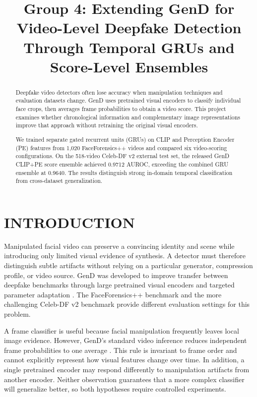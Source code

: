 \documentclass[conference,10pt]{IEEEtran}
\begin{document}
\title{Group 4: Extending GenD for Video-Level Deepfake Detection Through Temporal GRUs and Score-Level Ensembles}
\author{}
\maketitle
\begin{abstract}
Deepfake video detectors often lose accuracy when manipulation techniques and evaluation datasets change. GenD uses pretrained visual encoders to classify individual face crops, then averages frame probabilities to obtain a video score. This project examines whether chronological information and complementary image representations improve that approach without retraining the original visual encoders.

We trained separate gated recurrent units (GRUs) on CLIP and Perception Encoder (PE) features from 1,020 FaceForensics++ videos and compared six video-scoring configurations. On the 518-video Celeb-DF v2 external test set, the released GenD CLIP+PE score ensemble achieved 0.9712 AUROC, exceeding the combined GRU ensemble at 0.9640. The results distinguish strong in-domain temporal classification from cross-dataset generalization.

\end{abstract}
\clearpage
\section{INTRODUCTION}
Manipulated facial video can preserve a convincing identity and scene while introducing only limited visual evidence of synthesis. A detector must therefore distinguish subtle artifacts without relying on a particular generator, compression profile, or video source. GenD was developed to improve transfer between deepfake benchmarks through large pretrained visual encoders and targeted parameter adaptation \cite{yermakov2026}. The FaceForensics++ benchmark \cite{rossler2019} and the more challenging Celeb-DF v2 benchmark \cite{li2020} provide different evaluation settings for this problem.

A frame classifier is useful because facial manipulation frequently leaves local image evidence. However, GenD’s standard video inference reduces independent frame probabilities to one average \cite{yermakov2026}. This rule is invariant to frame order and cannot explicitly represent how visual features change over time. In addition, a single pretrained encoder may respond differently to manipulation artifacts from another encoder. Neither observation guarantees that a more complex classifier will generalize better, so both hypotheses require controlled experiments.
\end{document}
